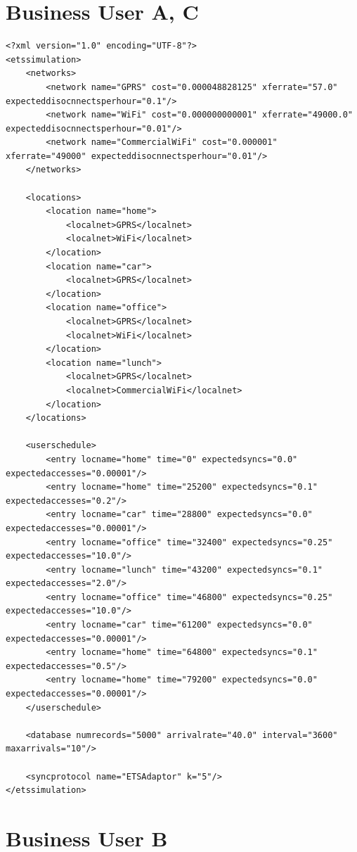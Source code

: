 \section{Business User A, C}\label{business_a}

\begin{lstlisting}
<?xml version="1.0" encoding="UTF-8"?>
<etssimulation>
	<networks>
		<network name="GPRS" cost="0.000048828125" xferrate="57.0" expecteddisocnnectsperhour="0.1"/>
		<network name="WiFi" cost="0.000000000001" xferrate="49000.0" expecteddisocnnectsperhour="0.01"/>
		<network name="CommercialWiFi" cost="0.000001" xferrate="49000" expecteddisocnnectsperhour="0.01"/>
	</networks>

	<locations>
		<location name="home">
			<localnet>GPRS</localnet>
			<localnet>WiFi</localnet>
		</location>
		<location name="car">
			<localnet>GPRS</localnet>
		</location>
		<location name="office">
			<localnet>GPRS</localnet>
			<localnet>WiFi</localnet>
		</location>
		<location name="lunch">
			<localnet>GPRS</localnet>
			<localnet>CommercialWiFi</localnet>
		</location>
	</locations>

	<userschedule>
		<entry locname="home" time="0" expectedsyncs="0.0" expectedaccesses="0.00001"/>
		<entry locname="home" time="25200" expectedsyncs="0.1" expectedaccesses="0.2"/>		
		<entry locname="car" time="28800" expectedsyncs="0.0" expectedaccesses="0.00001"/>
		<entry locname="office" time="32400" expectedsyncs="0.25" expectedaccesses="10.0"/>
		<entry locname="lunch" time="43200" expectedsyncs="0.1" expectedaccesses="2.0"/>
		<entry locname="office" time="46800" expectedsyncs="0.25" expectedaccesses="10.0"/>
		<entry locname="car" time="61200" expectedsyncs="0.0" expectedaccesses="0.00001"/>
		<entry locname="home" time="64800" expectedsyncs="0.1" expectedaccesses="0.5"/>		
		<entry locname="home" time="79200" expectedsyncs="0.0" expectedaccesses="0.00001"/>				
	</userschedule>

	<database numrecords="5000" arrivalrate="40.0" interval="3600" maxarrivals="10"/>

	<syncprotocol name="ETSAdaptor" k="5"/>
</etssimulation>
\end{lstlisting}

\section{Business User B}\label{business_b}

